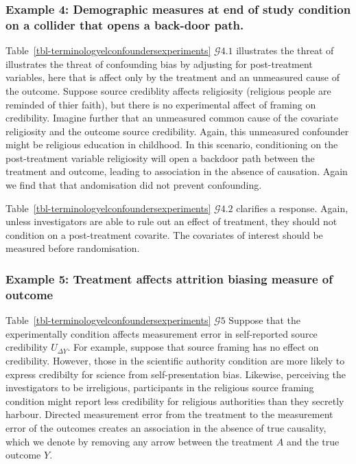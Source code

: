 \documentclass[
  single column]{article}
\begin{document}
\subsubsection{Example 4: Demographic measures at end of study condition
on a collider that opens a back-door
path.}\label{example-4-demographic-measures-at-end-of-study-condition-on-a-collider-that-opens-a-back-door-path.}

Table~\ref{tbl-terminologyelconfoundersexperiments} \(\mathcal{G} 4.1\)
illustrates the threat of illustrates the threat of confounding bias by
adjusting for post-treatment variables, here that is affect only by the
treatment and an unmeasured cause of the outcome. Suppose source
crediblity affects religiosity (religious people are reminded of thier
faith), but there is no experimental affect of framing on credibility.
Imagine further that an unmeasured common cause of the covariate
religiosity and the outcome source credibility. Again, this unmeasured
confounder might be religious education in childhood. In this scenario,
conditioning on the post-treatment variable religiosity will open a
backdoor path between the treatment and outcome, leading to association
in the absence of causation. Again we find that that andomisation did
not prevent confounding.

Table~\ref{tbl-terminologyelconfoundersexperiments} \(\mathcal{G} 4.2\)
clarifies a response. Again, unless investigators are able to rule out
an effect of treatment, they should not condition on a post-treatment
covarite. The covariates of interest should be measured before
randomisation.

\subsubsection{Example 5: Treatment affects attrition biasing measure of
outcome}\label{example-5-treatment-affects-attrition-biasing-measure-of-outcome}

Table~\ref{tbl-terminologyelconfoundersexperiments} \(\mathcal{G} 5\)
Suppose that the experimentally condition affects measurement error in
self-reported source credibility \(U_{\Delta Y}\). For example, suppose
that source framing has no effect on credibility. However, those in the
scientific authority condition are more likely to express credibilty for
science from self-presentation bias. Likewise, perceiving the
investigators to be irreligious, participants in the religious source
framing condition might report less credibility for religious
authorities than they secretly harbour. Directed measurement error from
the treatment to the measurement error of the outcomes creates an
association in the absence of true causality, which we denote by
removing any arrow between the treatment \(A\) and the true outcome
\(Y\).
\end{document}
